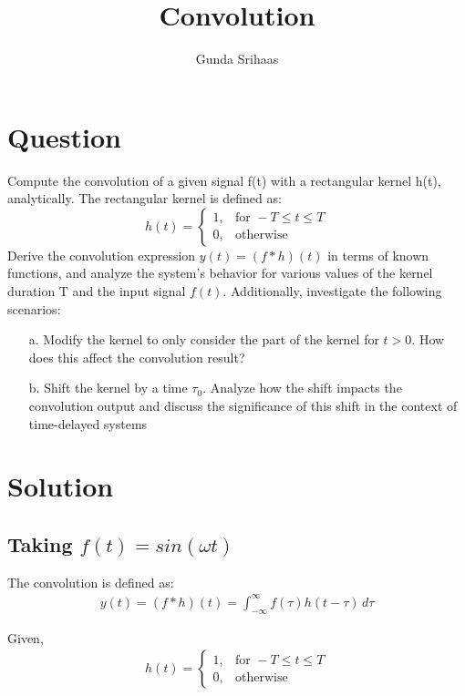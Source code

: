 \documentclass{article}
\title{Convolution}
\author{Gunda Srihaas}
\date{}
\begin{document}
\maketitle

\section{Question} 
Compute the convolution of a given signal f(t) with a rectangular kernel h(t), analytically. The rectangular kernel
is defined as:
\[
h(t)=
\begin{cases}
    1, & \text{for } -T \leq t \leq T \\
    0, & \text{otherwise}
\end{cases}
\]
Derive the convolution expression $y(t) = (f * h)(t)$ in terms of known functions, and analyze the system’s behavior
for various values of the kernel duration T and the input signal $f(t)$. Additionally, investigate the following scenarios:\\
\begin{enumerate}
\item[a.] Modify the kernel to only consider the part of the kernel for $t > 0$. How does this affect the convolution result?\\
\item [b.] Shift the kernel by a time $\tau_0$. Analyze how the shift impacts the convolution output and discuss the significance
of this shift in the context of time-delayed systems
\end{enumerate}

\section{Solution}
\subsection{\textbf{Taking $f(t)= sin(\omega t)$}}
The convolution is defined as:
\begin{align*}
y(t) = (f * h)(t) = \int_{-\infty}^{\infty} f(\tau) h(t - \tau) \, d\tau
\end{align*}

Given,
\begin{align*}
h(t)=
\begin{cases}
    1, & \text{for } -T \leq t \leq T \\
    0, & \text{otherwise}
\end{cases}
\end{align*}
\end{document}

